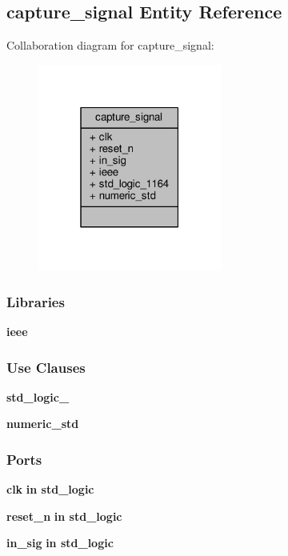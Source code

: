 \subsection{capture\+\_\+signal Entity Reference}
\label{classcapture__signal}


Collaboration diagram for capture\+\_\+signal\+:\nopagebreak
\begin{figure}[H]
\begin{center}
\leavevmode
\includegraphics[width=171pt]{d6/dc2/classcapture__signal__coll__graph}
\end{center}
\end{figure}
\subsubsection*{Libraries}
 \begin{DoxyCompactItemize}
\item 
{\bf ieee} 
\end{DoxyCompactItemize}
\subsubsection*{Use Clauses}
 \begin{DoxyCompactItemize}
\item 
{\bf std\+\_\+logic\+\_}   
\item 
{\bf numeric\+\_\+std}   
\end{DoxyCompactItemize}
\subsubsection*{Ports}
 \begin{DoxyCompactItemize}
\item 
{\bf clk}  {\bfseries {\bfseries \textcolor{keywordflow}{in}\textcolor{vhdlchar}{ }}} {\bfseries \textcolor{comment}{std\+\_\+logic}\textcolor{vhdlchar}{ }} 
\item 
{\bf reset\+\_\+n}  {\bfseries {\bfseries \textcolor{keywordflow}{in}\textcolor{vhdlchar}{ }}} {\bfseries \textcolor{comment}{std\+\_\+logic}\textcolor{vhdlchar}{ }} 
\item 
{\bf in\+\_\+sig}  {\bfseries {\bfseries \textcolor{keywordflow}{in}\textcolor{vhdlchar}{ }}} {\bfseries \textcolor{comment}{std\+\_\+logic}\textcolor{vhdlchar}{ }} 
\end{DoxyCompactItemize}


